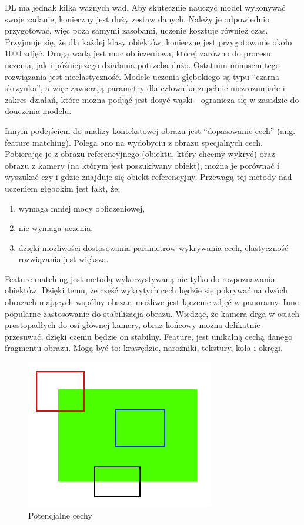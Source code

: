 \documentclass[12pt,twoside,polish]{article}
\begin{document}
DL ma jednak kilka ważnych wad. Aby skutecznie nauczyć model wykonywać swoje zadanie, konieczny jest duży zestaw danych. Należy je odpowiednio przygotować, więc poza samymi zasobami, uczenie kosztuje również czas. Przyjmuje się, że dla każdej klasy obiektów, konieczne jest przygotowanie około 1000 zdjęć. Drugą wadą jest moc obliczeniowa, której zarówno do procesu uczenia, jak i późniejszego działania potrzeba dużo. Ostatnim minusem tego rozwiązania jest nieelastyczność. Modele uczenia głębokiego są typu \enquote{czarna skrzynka}, a więc zawierają parametry dla człowieka zupełnie niezrozumiałe i zakres działań, które można podjąć jest dosyć wąski - ogranicza się w zasadzie do douczenia modelu.

Innym podejściem do analizy kontekstowej obrazu jest \enquote{dopasowanie cech} (ang. feature matching). Polega ono na wydobyciu z obrazu specjalnych cech. Pobierając je z obrazu referencyjnego (obiektu, który chcemy wykryć) oraz obrazu z kamery (na którym jest poszukiwany obiekt), można je porównać i wyszukać czy i gdzie znajduje się obiekt referencyjny. Przewagą tej metody nad uczeniem głębokim jest fakt, że:
\begin{enumerate}[label=\alph*), leftmargin=1.25cm]
	\item wymaga mniej mocy obliczeniowej,
	\item nie wymaga uczenia,
	\item dzięki możliwości dostosowania parametrów wykrywania cech, elastyczność rozwiązania jest większa.
\end{enumerate}

Feature matching jest metodą wykorzystywaną nie tylko do rozpoznawania obiektów. Dzięki temu, że część wykrytych cech będzie się pokrywać na dwóch obrazach mających wspólny obszar, możliwe jest łączenie zdjęć w panoramy. Inne popularne zastosowanie do stabilizacja obrazu. Wiedząc, że kamera drga w osiach prostopadłych do osi głównej kamery, obraz końcowy można delikatnie przesuwać, dzięki czemu będzie on stabilny. Feature, jest unikalną cechą danego fragmentu obrazu. Mogą być to: krawędzie, narożniki, tekstury, koła i okręgi.

\begin{figure}[h]
	\centering
	\includegraphics{features}
	\caption{Potencjalne cechy}
	\label{features}
\end{figure}
\end{document}
